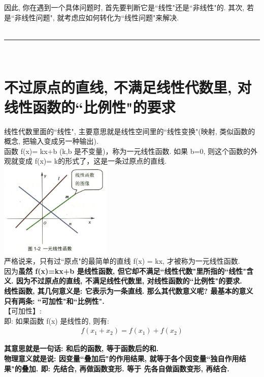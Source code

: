 \documentclass[UTF8]{ctexart}
\begin{document}
因此, 你在遇到一个具体问题时, 首先要判断它是``线性"还是``非线性"的. 其次, 若是``非线性问题", 就考虑应如何转化为``线性问题"来解决. \\

~\\
\hrule
~\\


\section{不过原点的直线, 不满足线性代数里, 对线性函数的``比例性"的要求}

线性代数里面的``线性", 主要意思就是线性空间里的``线性变换"(映射, 类似函数的概念, 把输入变成另一种输出).\\

函数 f(x)= kx+b (k,b 是不变量)，称为一元线性函数. 如果 b=0, 则这个函数的外观就变成 f(x)= k的形式了，这是一条过原点的直线.\\

\includegraphics[width=0.4\textwidth]{img/0111.png}\\

严格说来，只有过``原点"的最简单的直线 f(x) = kx, 才被称为一元线性函数.\\

因为\textbf{虽然 f(x)=kx+b 是线性函数, 但它却不满足``线性代数"里所指的``线性"含义. 因为不过原点的直线, 不满足线性代数里, 对线性函数的``比例性"的要求.}\\

\textbf{线性函数, 其几何意义是: 它表示为一条直线. 那么其代数意义呢? 最基本的意义只有两条: ``可加性"和``比例性". }\\

【可加性】:\\
即: 如果函数 f(x) 是线性的, 则有:
\begin{align*}
	\boxed{
	f\left( x_1+x_2 \right) =f\left( x_1 \right) +f\left( x_2 \right)	
	}
\end{align*}

\textbf{其意思就是一句话: 和后的函数, 等于函数后的和.} \\
\textbf{物理意义就是说: 因变量``叠加后"的作用结果, 就等于各个因变量``独自作用结果"的叠加. 即: 先结合, 再做函数变形. 等于 先各自做函数变形, 再结合.}\\
\end{document}
